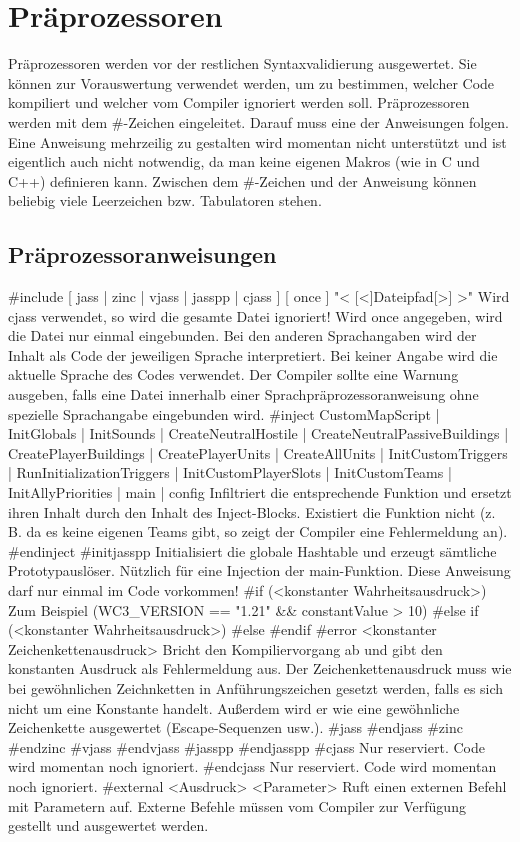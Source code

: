 \chapter{Präprozessoren}
Präprozessoren werden vor der restlichen Syntaxvalidierung ausgewertet.
Sie können zur Vorauswertung verwendet werden, um zu bestimmen, welcher Code kompiliert und welcher vom Compiler ignoriert werden soll.
Präprozessoren werden mit dem #-Zeichen eingeleitet. Darauf muss eine der Anweisungen folgen.
Eine Anweisung mehrzeilig zu gestalten wird momentan nicht unterstützt und ist eigentlich auch nicht
notwendig, da man keine eigenen Makros (wie in C und C++) definieren kann.
Zwischen dem #-Zeichen und der Anweisung können beliebig viele Leerzeichen bzw. Tabulatoren stehen.

\section{Präprozessoranweisungen}
#include [ jass | zinc | vjass | jasspp | cjass ] [ once ] "< [<]Dateipfad[>] >" Wird cjass verwendet, so wird die gesamte Datei ignoriert! Wird once angegeben, wird die Datei nur einmal eingebunden. Bei den anderen Sprachangaben wird der Inhalt als Code der jeweiligen Sprache interpretiert. Bei keiner Angabe wird die aktuelle Sprache des Codes verwendet. Der Compiler sollte eine Warnung ausgeben, falls eine Datei innerhalb einer Sprachpräprozessoranweisung ohne spezielle Sprachangabe eingebunden wird.
#inject CustomMapScript | InitGlobals | InitSounds | CreateNeutralHostile | CreateNeutralPassiveBuildings | CreatePlayerBuildings | CreatePlayerUnits | CreateAllUnits | InitCustomTriggers | RunInitializationTriggers | InitCustomPlayerSlots | InitCustomTeams | InitAllyPriorities | main | config                Infiltriert die entsprechende Funktion und ersetzt ihren Inhalt durch den Inhalt des Inject-Blocks. Existiert die Funktion nicht (z. B. da es keine eigenen Teams gibt, so zeigt der Compiler eine Fehlermeldung an).
#endinject
#initjasspp                                       Initialisiert die globale Hashtable und erzeugt sämtliche Prototypauslöser. Nützlich für eine Injection der main-Funktion. Diese Anweisung darf nur einmal im Code vorkommen!
#if (<konstanter Wahrheitsausdruck>)              Zum Beispiel (WC3_VERSION == "1.21" && constantValue > 10)
#else if (<konstanter Wahrheitsausdruck>)
#else
#endif
#error <konstanter Zeichenkettenausdruck>         Bricht den Kompiliervorgang ab und gibt den konstanten Ausdruck als Fehlermeldung aus. Der Zeichenkettenausdruck muss wie bei gewöhnlichen Zeichnketten in Anführungszeichen gesetzt werden, falls es sich nicht um eine Konstante handelt. Außerdem wird er wie eine gewöhnliche Zeichenkette ausgewertet (Escape-Sequenzen usw.).
#jass
#endjass
#zinc
#endzinc
#vjass
#endvjass
#jasspp
#endjasspp
#cjass                                            Nur reserviert. Code wird momentan noch ignoriert.
#endcjass                                         Nur reserviert. Code wird momentan noch ignoriert.
#external <Ausdruck> <Parameter>                  Ruft einen externen Befehl mit Parametern auf. Externe Befehle müssen vom Compiler zur Verfügung gestellt und ausgewertet werden.

